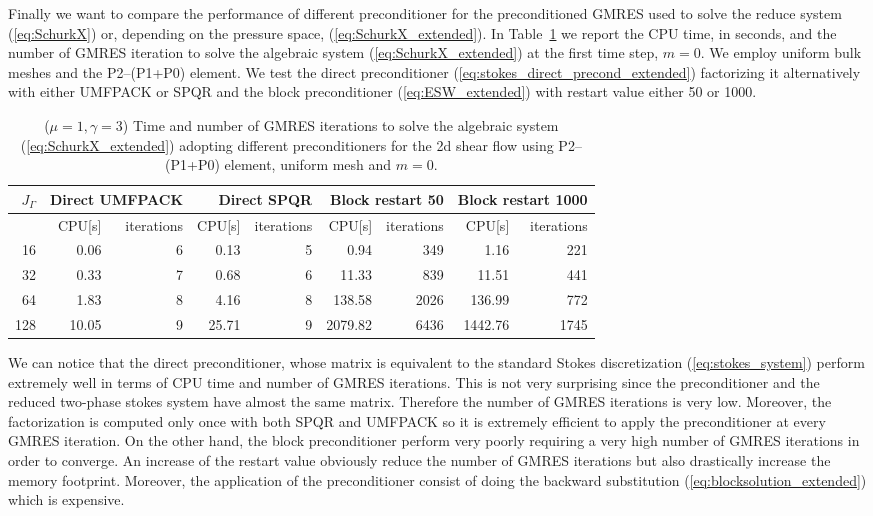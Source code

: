 Finally we want to compare the performance of different preconditioner
for the preconditioned GMRES used to solve the reduce system
(\ref{eq:SchurkX}) or, depending on the pressure space,
(\ref{eq:SchurkX_extended}). In Table~\ref{tab:shear_2d_preconditioners} we
report the CPU time, in seconds, and the number of GMRES iteration to solve the
algebraic system (\ref{eq:SchurkX_extended}) at the first time step, $m=0$. We
employ uniform bulk meshes and the P2--(P1+P0) element. We test the direct
preconditioner (\ref{eq:stokes_direct_precond_extended}) factorizing it
alternatively with either UMFPACK or SPQR and the block preconditioner
(\ref{eq:ESW_extended}) with restart value either 50 or 1000.
\begin{table}
\center
\hspace*{-3.25cm}
\begin{tabular}{rrrrrrrrr}
\hline
$J_\Gamma$ & \multicolumn{2}{r}{Direct UMFPACK} &
\multicolumn{2}{r}{Direct SPQR} & \multicolumn{2}{r}{Block restart 50} &
\multicolumn{2}{r}{Block restart 1000} \\
\hline
 & CPU[s] & iterations & CPU[s] & iterations & CPU[s] & iterations & CPU[s] &
iterations \\
\hline
 16 &  0.06 & 6 &  0.13 & 5 &    0.94 &  349 &    1.16 &  221 \\
 32 &  0.33 & 7 &  0.68 & 6 &   11.33 &  839 &   11.51 &  441 \\
 64 &  1.83 & 8 &  4.16 & 8 &  138.58 & 2026 &  136.99 &  772 \\
128 & 10.05 & 9 & 25.71 & 9 & 2079.82 & 6436 & 1442.76 & 1745 \\
\hline
\end{tabular}
\hspace*{-3.25cm}
\caption[Stokes 2d shear flow preconditioners comparison]
{($\mu=1,\gamma=3$) Time and number of GMRES iterations to solve the algebraic
system (\ref{eq:SchurkX_extended}) adopting different preconditioners for the 2d
shear flow using P2--(P1+P0) element, uniform mesh and $m=0$.}
\label{tab:shear_2d_preconditioners}
\end{table}
We can notice that the direct preconditioner, whose matrix is equivalent to
the standard Stokes discretization (\ref{eq:stokes_system}) perform extremely
well in terms of CPU time and number of GMRES iterations. This is not very
surprising since the preconditioner and the reduced two-phase stokes system
have almost the same matrix. Therefore the number of GMRES iterations is very
low. Moreover, the factorization is computed only once with both SPQR and
UMFPACK so it is extremely efficient to apply the preconditioner at every GMRES
iteration. On the other hand, the block preconditioner perform very poorly
requiring a very high number of GMRES iterations in order to converge. An
increase of the restart value obviously reduce the number of GMRES iterations
but also drastically increase the memory footprint. Moreover, the application
of the preconditioner consist of doing the backward substitution
(\ref{eq:blocksolution_extended}) which is expensive.

